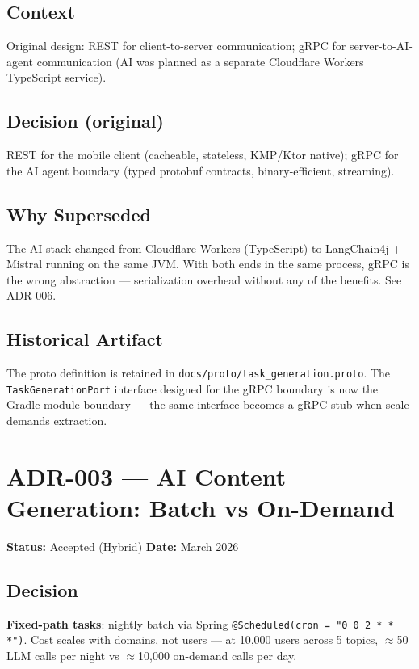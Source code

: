 \subsection*{Context}
Original design: REST for client-to-server communication; gRPC for server-to-AI-agent communication (AI was planned as a separate Cloudflare Workers TypeScript service).

\subsection*{Decision (original)}
REST for the mobile client (cacheable, stateless, KMP/Ktor native); gRPC for the AI agent boundary (typed protobuf contracts, binary-efficient, streaming).

\subsection*{Why Superseded}
The AI stack changed from Cloudflare Workers (TypeScript) to LangChain4j + Mistral running on the same JVM. With both ends in the same process, gRPC is the wrong abstraction — serialization overhead without any of the benefits. See ADR-006.

\subsection*{Historical Artifact}
The proto definition is retained in \texttt{docs/proto/task\_generation.proto}. The \texttt{TaskGenerationPort} interface designed for the gRPC boundary is now the Gradle module boundary — the same interface becomes a gRPC stub when scale demands extraction.

\section{ADR-003 — AI Content Generation: Batch vs On-Demand}
\label{adr:003}
\textbf{Status:} Accepted (Hybrid) \quad \textbf{Date:} March 2026

\subsection*{Decision}
\textbf{Fixed-path tasks}: nightly batch via Spring \texttt{@Scheduled(cron = "0 0 2 * * *")}. Cost scales with domains, not users — at 10,000 users across 5 topics, $\approx$50 LLM calls per night vs $\approx$10,000 on-demand calls per day.

